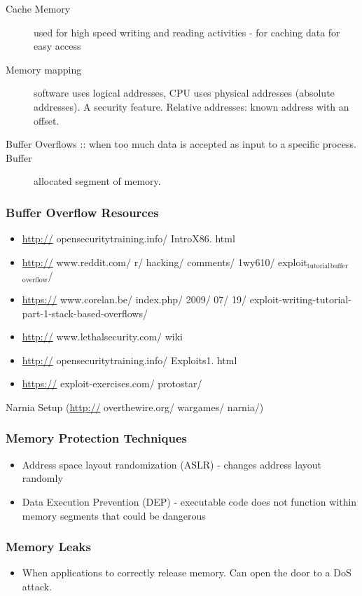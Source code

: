 \documentclass[11pt]{article}
\begin{document}
\begin{description}
\begin{description}
\begin{description}
\end{description}
\end{description}
\item[{Cache Memory}] used for high speed writing and reading activities - for caching data for easy access
\item[{Memory mapping}] software uses logical addresses, CPU uses physical addresses (absolute addresses). A security feature. Relative addresses: known address with an offset.
\item[{Buffer Overflows :: when too much data is accepted as input to a specific process. Buffer}] allocated segment of memory.
\end{description}
\subsubsection{Buffer Overflow Resources}
\label{sec:orgc415206}
\begin{itemize}
\item \url{http://} opensecuritytraining.info/ IntroX86. html
\item \url{http://} www.reddit.com/ r/ hacking/ comments/ 1wy610/ exploit\(_{\text{tutorial}}\)\(_{\text{buffer}}\)\(_{\text{overflow}}\)/
\item \url{https://} www.corelan.be/ index.php/ 2009/ 07/ 19/ exploit-writing-tutorial-part-1-stack-based-overflows/
\item \url{http://} www.lethalsecurity.com/ wiki
\item \url{http://} opensecuritytraining.info/ Exploits1. html
\item \url{https://} exploit-exercises.com/ protostar/
\end{itemize}
Narnia Setup (\url{http://} overthewire.org/ wargames/ narnia/)
\subsubsection{Memory Protection Techniques}
\label{sec:org5c855a9}
\begin{itemize}
\item Address space layout randomization (ASLR) - changes address layout randomly
\item Data Execution Prevention (DEP) - executable code does not function within memory segments that could be dangerous
\end{itemize}
\subsubsection{Memory Leaks}
\label{sec:org0a70d23}
\begin{itemize}
\item When applications to correctly release memory. Can open the door to a DoS attack.
\end{itemize}
\end{document}
